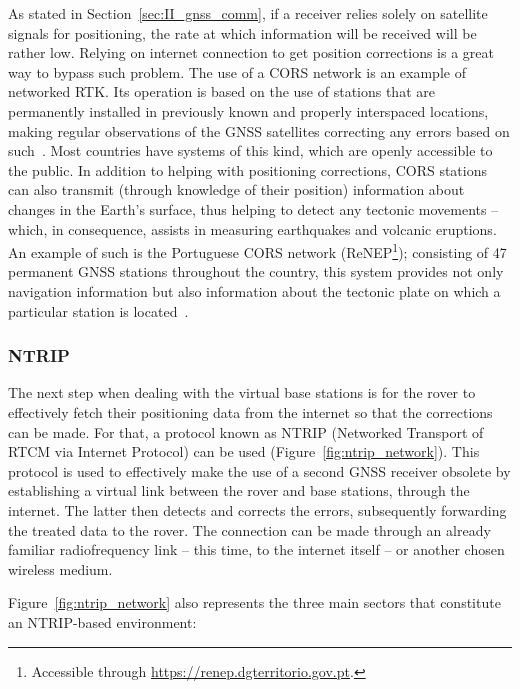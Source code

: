 As stated in Section~\ref{sec:II_gnss_comm}, if a receiver relies solely on satellite signals for positioning, the rate at which information will be received will be rather low. Relying on internet connection to get position corrections is a great way to bypass such problem. The use of a \gls{CORS} network is an example of networked RTK. Its operation is based on the use of stations that are permanently installed in previously known and properly interspaced locations, making regular observations of the GNSS satellites correcting any errors based on such~\cite{novatel_gnss}.
Most countries have systems of this kind, which are openly accessible to the public. In addition to helping with positioning corrections, CORS stations can also transmit (through knowledge of their position) information about changes in the Earth's surface, thus helping to detect any tectonic movements -- which, in consequence, assists in measuring earthquakes and volcanic eruptions. An example of such is the Portuguese CORS network (ReNEP\footnote{Accessible through \url{https://renep.dgterritorio.gov.pt}.}); consisting of 47 permanent GNSS stations throughout the country, this system provides not only navigation information but also information about the tectonic plate on which a particular station is located~\cite{ReNEP_ppt_2018}.

\subsubsection{NTRIP}\label{sec:II_networkedRTK_ntrip}

The next step when dealing with the virtual base stations is for the rover to effectively fetch their positioning data from the internet so that the corrections can be made. For that, a protocol known as NTRIP (Networked Transport of RTCM via Internet Protocol) can be used (Figure~\ref{fig:ntrip_network}). This protocol is used to effectively make the use of a second GNSS receiver obsolete by establishing a virtual link between the rover and base stations, through the internet. The latter then detects and corrects the errors, subsequently forwarding the treated data to the rover. The connection can be made through an already familiar radiofrequency link -- this time, to the internet itself -- or another chosen wireless medium.

Figure~\ref{fig:ntrip_network} also represents the three main sectors that constitute an NTRIP-based environment:

